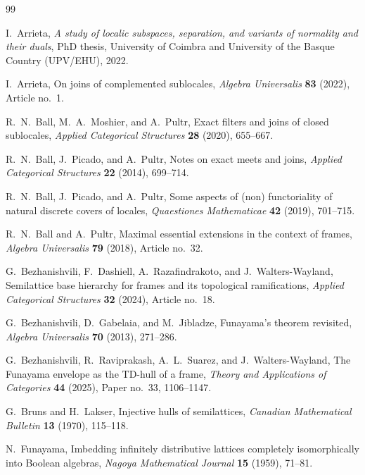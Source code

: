 \documentclass[11pt,a4paper,reqno]{amsart}
\theoremstyle{definition}
\theoremstyle{remark}
\begin{document}
{\begin{thebibliography}{99}

I.~Arrieta, 
\emph{A study of localic subspaces, separation, and variants of normality and their duals}, 
PhD thesis, University of Coimbra and University of the Basque Country (UPV/EHU), 2022.

I.~Arrieta, 
On joins of complemented sublocales, 
\emph{Algebra Universalis} \textbf{83} (2022), Article no.~1.

R.~N.~Ball, M.~A.~Moshier, and A.~Pultr, 
Exact filters and joins of closed sublocales, 
\emph{Applied Categorical Structures} \textbf{28} (2020), 655--667.

R.~N.~Ball, J.~Picado, and A.~Pultr, 
Notes on exact meets and joins, 
\emph{Applied Categorical Structures} \textbf{22} (2014), 699--714.

R.~N.~Ball, J.~Picado, and A.~Pultr, 
Some aspects of (non) functoriality of natural discrete covers of locales, 
\emph{Quaestiones Mathematicae} \textbf{42} (2019), 701--715.

R.~N.~Ball and A.~Pultr, 
Maximal essential extensions in the context of frames, 
\emph{Algebra Universalis} \textbf{79} (2018), Article no.~32.

G.~Bezhanishvili, F.~Dashiell, A.~Razafindrakoto, and J.~Walters-Wayland, 
Semilattice base hierarchy for frames and its topological ramifications, 
\emph{Applied Categorical Structures} \textbf{32} (2024), Article no.~18.

G.~Bezhanishvili, D.~Gabelaia, and M.~Jibladze, 
Funayama's theorem revisited, 
\emph{Algebra Universalis} \textbf{70} (2013), 271--286.

G.~Bezhanishvili, R.~Raviprakash, A.~L.~Suarez, and J.~Walters-Wayland, 
The Funayama envelope as the TD-hull of a frame, 
\emph{Theory and Applications of Categories} \textbf{44} (2025), Paper no.~33, 1106--1147.

G.~Bruns and H.~Lakser, 
Injective hulls of semilattices, 
\emph{Canadian Mathematical Bulletin} \textbf{13} (1970), 115--118.

N.~Funayama, 
Imbedding infinitely distributive lattices completely isomorphically into Boolean algebras, 
\emph{Nagoya Mathematical Journal} \textbf{15} (1959), 71--81.



\end{thebibliography}}
\end{document}
